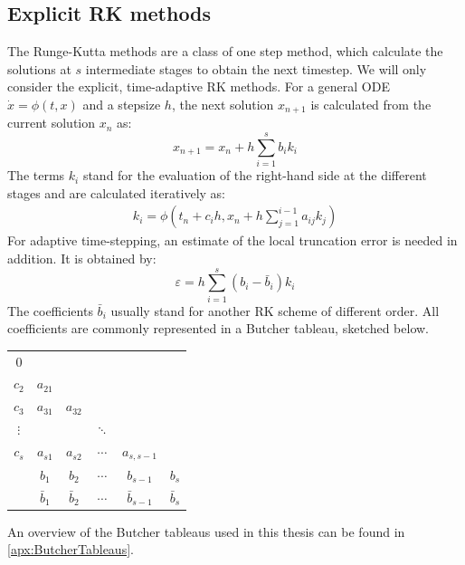 \subsection{Explicit RK methods}
The Runge-Kutta methods are a class of one step method, which calculate the solutions at $s$ intermediate stages to obtain the next timestep. We will only consider the explicit, time-adaptive RK methods. For a general ODE $\dot{x} = \phi(t,x)$ and a stepsize $h$, the next solution $x_{n+1}$ is calculated from the current solution $x_n$ as: 
\begin{equation}
	x_{n+1}	= x_n + h\sum_{i=1}^{s}b_ik_i
\end{equation}
The terms $k_i$ stand for the evaluation of the right-hand side at the different stages and are calculated iteratively as:
\begin{align}
	k_i = \phi\left(t_n + c_ih, x_n + h\sum_{j=1}^{i-1}a_{ij}k_j\right)
\end{align}
For adaptive time-stepping, an estimate of the local truncation error is needed in addition. It is obtained by: 
\begin{equation}
	\varepsilon	= h\sum_{i=1}^{s}(b_i - \bar{b}_i)k_i
\end{equation}
The coefficients $\bar{b}_i$ usually stand for another RK scheme of different order. All coefficients are commonly represented in a Butcher tableau, sketched below.
\begin{center}
\begin{tabular}{c | c c c c c }
	$0$ & & & & & \\
	$c_2$ & $a_{21}$ & & & & \\
	$c_3$ & $a_{31}$ & $a_{32}$ & & & \\  
	$\vdots$ & & & $\ddots$ & & \\
	$c_s$ & $a_{s1}$ & $a_{s2}$ & $\cdots$ & $a_{s,s-1}$ & \\ \hline
	& $b_1$ & $b_2$ & $\cdots$ & $b_{s-1}$ & $b_s$ \\ 
	& $\bar{b}_1$ & $\bar{b}_2$ & $\cdots$ & $\bar{b}_{s-1}$ & $\bar{b}_s$ 
\end{tabular}
\end{center}

An overview of the Butcher tableaus used in this thesis can be found in \autoref{apx:ButcherTableaus}.


